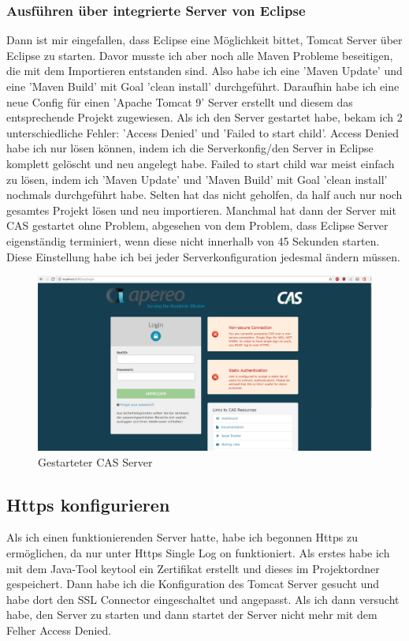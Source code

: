 \subsubsection{Ausführen über integrierte Server von Eclipse}

Dann ist mir eingefallen, dass Eclipse eine Möglichkeit bittet, Tomcat Server über Eclipse zu starten. 
\newline
Davor musste ich aber noch alle Maven Probleme beseitigen, die mit dem Importieren entstanden sind. Also habe ich eine 'Maven Update' und eine 'Maven Build' mit Goal 'clean install' durchgeführt. Daraufhin habe ich eine neue Config für einen 'Apache Tomcat 9' Server erstellt und diesem das entsprechende Projekt zugewiesen.
\newline
Als ich den Server gestartet habe, bekam ich 2 unterschiedliche Fehler: 'Access Denied' und 'Failed to start child'.
\newline
Access Denied habe ich nur lösen können, indem ich die Serverkonfig/den Server in Eclipse komplett gelöscht und neu angelegt habe.
\newline
Failed to start child war meist einfach zu lösen, indem ich 'Maven Update' und 'Maven Build' mit Goal 'clean install' nochmals durchgeführt habe. Selten hat das nicht geholfen, da half auch nur noch gesamtes Projekt lösen und neu importieren.
\newline
Manchmal hat dann der Server mit CAS gestartet ohne Problem, abgesehen von dem Problem, dass Eclipse Server eigenständig terminiert, wenn diese nicht innerhalb von 45 Sekunden starten. Diese Einstellung habe ich bei jeder Serverkonfiguration jedesmal ändern müssen.

\begin{figure}[h]
\centering
\includegraphics[width=0.7\linewidth]{images/bildCool}
\caption{Gestarteter CAS Server}
\label{fig:bildcool}
\end{figure}


\subsection{Https konfigurieren}

Als ich einen funktionierenden Server hatte, habe ich begonnen Https zu ermöglichen, da nur unter Https Single Log on funktioniert.
\newline
Als erstes habe ich mit dem Java-Tool keytool ein Zertifikat erstellt und dieses im Projektordner gespeichert.
\newline
Dann habe ich die Konfiguration des Tomcat Server gesucht und habe dort den SSL Connector eingeschaltet und angepasst.
\newline
Als ich dann versucht habe, den Server zu starten und dann startet der Server nicht mehr mit dem Felher Access Denied.
